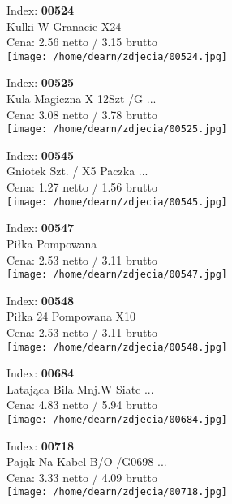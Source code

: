 {Index: \textbf{00524}\\
Kulki W Granacie  X24 \\
Cena: 2.56 netto / 3.15 brutto\\
  \texttt{[image: /home/dearn/zdjecia/00524.jpg]}}\newline\newline

{Index: \textbf{00525}\\
Kula Magiczna  X 12Szt /G ...\\
Cena: 3.08 netto / 3.78 brutto\\
  \texttt{[image: /home/dearn/zdjecia/00525.jpg]}}\newline\newline

{Index: \textbf{00545}\\
Gniotek Szt. / X5  Paczka ...\\
Cena: 1.27 netto / 1.56 brutto\\
  \texttt{[image: /home/dearn/zdjecia/00545.jpg]}}\newline\newline

{Index: \textbf{00547}\\
Piłka Pompowana \\
Cena: 2.53 netto / 3.11 brutto\\
  \texttt{[image: /home/dearn/zdjecia/00547.jpg]}}\newline\newline

{Index: \textbf{00548}\\
Piłka 24  Pompowana  X10\\
Cena: 2.53 netto / 3.11 brutto\\
  \texttt{[image: /home/dearn/zdjecia/00548.jpg]}}\newline\newline

{Index: \textbf{00684}\\
Latająca Bila Mnj.W Siatc ...\\
Cena: 4.83 netto / 5.94 brutto\\
  \texttt{[image: /home/dearn/zdjecia/00684.jpg]}}\newline\newline

{Index: \textbf{00718}\\
Pająk Na Kabel B/O /G0698 ...\\
Cena: 3.33 netto / 4.09 brutto\\
  \texttt{[image: /home/dearn/zdjecia/00718.jpg]}}\newline\newline

